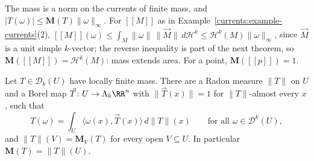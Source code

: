 The mass is a norm on the currents of finite mass, and $|T(\omega)| \leq \mathbf{M}(T)\|\omega\|_\infty$. For $[\![M]\!]$ as in Example~\ref{currents:example-currents}(2),
$[\![M]\!](\omega) \leq \int_M\|\omega\|\,\|\vec{M}\|\,d\mathcal{H}^k \leq \mathcal{H}^k(M)\|\omega\|_\infty$, since $\vec{M}$ is a unit simple $k$-vector; the reverse inequality is part of the next theorem, so
$\mathbf{M}([\![M]\!]) = \mathcal{H}^k(M)$: mass extends area. For a point, $\mathbf{M}([\![p]\!]) = 1$.

\begin{theorem}\label{currents:theorem-representation}
Let $T \in \mathcal{D}_k(U)$ have locally finite mass. There are a Radon measure $\|T\|$ on $U$ and a Borel map $\vec{T} \colon U \to \Lambda_k\RR^n$ with $\|\vec{T}(x)\| = 1$ for $\|T\|$-almost every $x$, such that
\[
T(\omega) = \int_U\langle\omega(x), \vec{T}(x)\rangle\,d\|T\|(x) \qquad \text{for all } \omega \in \mathcal{D}^k(U),
\]
and $\|T\|(V) = \mathbf{M}_V(T)$ for every open $V \subseteq U$. In particular $\mathbf{M}(T) = \|T\|(U)$.
\end{theorem}

